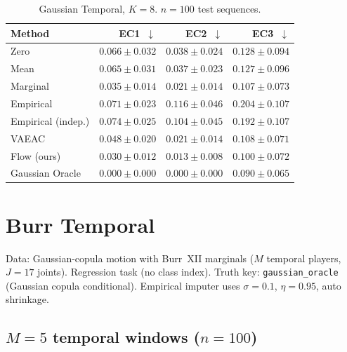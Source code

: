 \documentclass[11pt]{article}
\begin{document}
\begin{table}[h]
\centering
\caption{Gaussian Temporal, $K=8$. $n=100$ test sequences.}
\label{tab:gauss_k8}
\begin{tabular}{lrrr}
\toprule
Method               & EC1~$\downarrow$           & EC2~$\downarrow$           & EC3~$\downarrow$ \\
\midrule
Zero                 & $0.066 \pm 0.032$          & $0.038 \pm 0.024$          & $0.128 \pm 0.094$ \\
Mean                 & $0.065 \pm 0.031$          & $0.037 \pm 0.023$          & $0.127 \pm 0.096$ \\
Marginal             & $0.035 \pm 0.014$          & $0.021 \pm 0.014$          & $0.107 \pm 0.073$ \\
Empirical            & $0.071 \pm 0.023$          & $0.116 \pm 0.046$          & $0.204 \pm 0.107$ \\
Empirical (indep.)   & $0.074 \pm 0.025$          & $0.104 \pm 0.045$          & $0.192 \pm 0.107$ \\
VAEAC                & $0.048 \pm 0.020$          & $0.021 \pm 0.014$          & $0.108 \pm 0.071$ \\
Flow (ours)          & $\mathbf{0.030 \pm 0.012}$ & $\mathbf{0.013 \pm 0.008}$ & $\mathbf{0.100 \pm 0.072}$ \\
\midrule
Gaussian Oracle      & $0.000 \pm 0.000$          & $0.000 \pm 0.000$          & $0.090 \pm 0.065$ \\
\bottomrule
\end{tabular}
\end{table}

\section{Burr Temporal}

\noindent
Data: Gaussian-copula motion with Burr~XII marginals
($M$ temporal players, $J=17$ joints).
Regression task (no class index).
Truth key: \texttt{gaussian\_oracle} (Gaussian copula conditional).
Empirical imputer uses $\sigma=0.1$, $\eta=0.95$, auto shrinkage.

\subsection{$M = 5$ temporal windows \quad ($n = 100$)}
\end{document}
